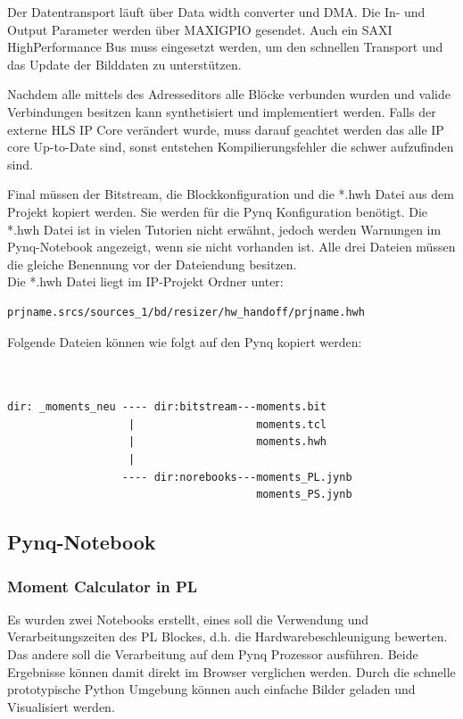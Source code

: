 \documentclass[a4paper]{report}
\begin{document}
Der Datentransport läuft über Data width converter und DMA. Die In- und Output Parameter werden über MAXIGPIO gesendet. Auch ein SAXI HighPerformance Bus muss eingesetzt werden, um den schnellen Transport und das Update der Bilddaten zu unterstützen. 

Nachdem alle mittels des Adresseditors alle Blöcke verbunden wurden und valide Verbindungen besitzen kann synthetisiert und implementiert werden. Falls der externe HLS IP Core verändert wurde, muss darauf geachtet werden das alle IP core Up-to-Date sind, sonst entstehen Kompilierungsfehler die schwer aufzufinden sind. 

Final müssen der Bitstream, die Blockkonfiguration und die *.hwh Datei aus dem Projekt kopiert werden. Sie werden für die Pynq Konfiguration benötigt. Die *.hwh Datei ist in vielen Tutorien nicht erwähnt, jedoch werden Warnungen im Pynq-Notebook angezeigt, wenn sie nicht vorhanden ist. Alle drei Dateien müssen die gleiche Benennung vor der Dateiendung besitzen.\\

Die *.hwh Datei liegt im IP-Projekt Ordner unter: 

\begin{verbatim}
prjname.srcs/sources_1/bd/resizer/hw_handoff/prjname.hwh
\end{verbatim}

Folgende Dateien können wie folgt auf den Pynq kopiert werden:

\begin{verbatim}


dir: _moments_neu ---- dir:bitstream---moments.bit
                   |                   moments.tcl
                   |                   moments.hwh
                   |
                  ---- dir:norebooks---moments_PL.jynb
                                       moments_PS.jynb
\end{verbatim}

\subsection{Pynq-Notebook}
\subsubsection{Moment Calculator in PL}

Es wurden zwei Notebooks erstellt, eines soll die Verwendung und Verarbeitungszeiten des PL Blockes, d.h. die Hardwarebeschleunigung bewerten. Das andere soll die Verarbeitung auf dem Pynq Prozessor ausführen. Beide Ergebnisse können damit direkt im Browser verglichen werden. Durch die schnelle prototypische Python Umgebung können auch einfache Bilder geladen und Visualisiert werden.
\end{document}
